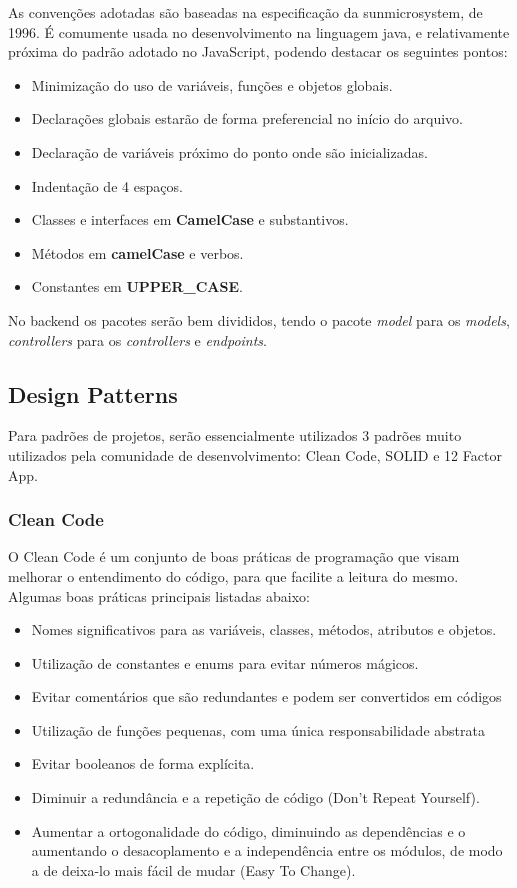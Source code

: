 As convenções adotadas são baseadas na especificação da \gls{sunmicrosystem}, de 1996. É comumente usada no desenvolvimento na linguagem java, e relativamente próxima do padrão adotado no JavaScript, podendo destacar os seguintes pontos:

\begin{itemize}
    \item Minimização do uso de variáveis, funções e objetos globais.
    \item Declarações globais estarão de forma preferencial no início do arquivo.
    \item Declaração de variáveis próximo do ponto onde são inicializadas.
    \item Indentação de 4 espaços.
    \item Classes e interfaces em \textbf{CamelCase} e substantivos.
    \item Métodos em \textbf{camelCase} e verbos.
    \item Constantes em \textbf{UPPER\_CASE}.
\end{itemize}

No \gls{backend} os pacotes serão bem divididos, tendo o pacote \emph{model} para os \emph{models}, \emph{controllers} para os \emph{controllers} e \emph{endpoints}. 

\subsection{Design Patterns}
Para padrões de projetos, serão essencialmente utilizados 3 padrões muito utilizados pela comunidade de desenvolvimento: Clean Code, SOLID e 12 Factor App.

\subsubsection{Clean Code}
O Clean Code é um conjunto de boas práticas de programação que visam melhorar o entendimento do código, para que facilite a leitura do mesmo. Algumas boas práticas principais listadas abaixo:

\begin{itemize}
    \item Nomes significativos para as variáveis, classes, métodos, atributos e objetos.
    \item Utilização de constantes e enums para evitar números mágicos.
    \item Evitar comentários que são redundantes e podem ser convertidos em códigos
    \item Utilização de funções pequenas, com uma única responsabilidade abstrata
    \item Evitar booleanos de forma explícita.
    \item Diminuir a redundância e a repetição de código (Don't Repeat Yourself).
    \item Aumentar a ortogonalidade do código, diminuindo as dependências e o aumentando o desacoplamento e a independência entre os módulos, de modo a de deixa-lo mais fácil de mudar (Easy To Change).
\end{itemize}

